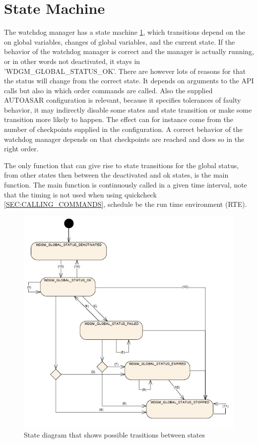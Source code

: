 
\section{State Machine}
The watchdog manager has a state machine \ref{FIG:GLOBALSTATUSES},
which transitions depend on the on global variables, changes of global
variables, and the current state. If the behavior of the watchdog manager is
correct and the manager is actually running, or in other words not deactivated,
it stays in 'WDGM\_GLOBAL\_STATUS\_OK'. There are however lots of reasons for
that the status will change from the correct state. It depends on arguments to
the API calls but also in which order commands are called. Also the supplied
AUTOASAR configuration is relevant, because it specifies tolerances of faulty
behavior, it may indirectly disable some states and state transition or make some
transition more likely to happen. The effect can for instance come from
the number of checkpoints supplied in the configuration. A correct behavior of
the watchdog manager depends on that checkpoints are reached and does so in the
right order.

The only function that can give rise to state transitions for the global status,
from other states then between the deactivated and ok states, is the main
function. The main function is continuously called in a given time interval,
note that the timing is not used when using quickcheck
\ref{SEC:CALLING_COMMANDS}, schedule be the run time environment (RTE).


\begin{figure}[h!]
\label{FIG:GLOBALSTATUSES}
\caption{State diagram that shows possible trasitions between states}
\begin{center}
\includegraphics{pictures/globalstatuses.jpg}
\end{center}
\end{figure}



